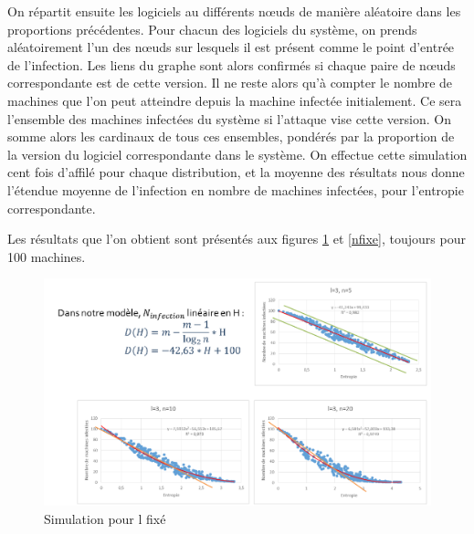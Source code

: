 On répartit ensuite les logiciels au différents nœuds de manière aléatoire dans les proportions précédentes.
Pour chacun des logiciels du système, on prends aléatoirement l'un des nœuds sur lesquels il est présent comme le point d'entrée de l'infection. Les liens du graphe sont alors confirmés si chaque paire de nœuds correspondante est de cette version. Il ne reste alors qu'à compter le nombre de machines que l'on peut atteindre depuis la machine infectée initialement. Ce sera l'ensemble des machines infectées du système si l'attaque vise cette version.
On somme alors les cardinaux de tous ces ensembles, pondérés par la proportion de la version du logiciel correspondante dans le système.
On effectue cette simulation cent fois d'affilé pour chaque distribution, et la moyenne des résultats nous donne l'étendue moyenne de l'infection en nombre de machines infectées, pour l'entropie correspondante.

Les résultats que l'on obtient sont présentés aux figures \ref{lfixe} et \ref{nfixe}, toujours pour 100 machines.

\begin{figure}[!ht]
\centering
     \includegraphics[width=1.0\linewidth]{Paul/python/lfixe.png}
     \caption{Simulation pour l fixé}
     \label{lfixe}
\end{figure}

